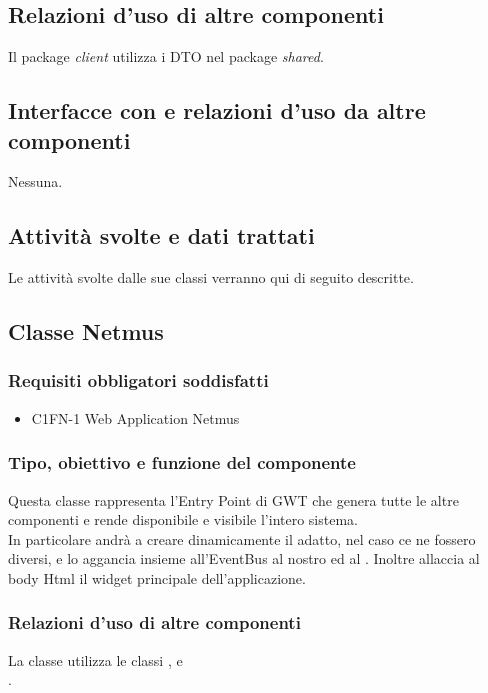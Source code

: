 \subsection*{Relazioni d'uso di altre componenti}
Il package \emph{client} utilizza i DTO nel package \emph{shared}.

\subsection*{Interfacce con e relazioni d'uso da altre componenti}
Nessuna.

\subsection*{Attivit\`a svolte e dati trattati}
Le attivit\`a svolte dalle sue classi verranno qui di seguito descritte.

\subsection{Classe Netmus}
\subsubsection*{Requisiti obbligatori soddisfatti}
\begin{itemize}
	\item C1FN-1 Web Application Netmus
\end{itemize}
\subsubsection*{Tipo, obiettivo e funzione del componente}
Questa classe rappresenta l'Entry Point di GWT che genera tutte le altre
componenti e rende disponibile e visibile l'intero sistema.\\
In particolare andr\`a a creare dinamicamente il  adatto,
nel caso ce ne fossero diversi, e lo aggancia insieme all'EventBus al nostro
 ed al .
Inoltre allaccia al body Html il widget principale dell'applicazione.

\subsubsection*{Relazioni d'uso di altre componenti}
La classe  utilizza le classi ,
 e \\.


